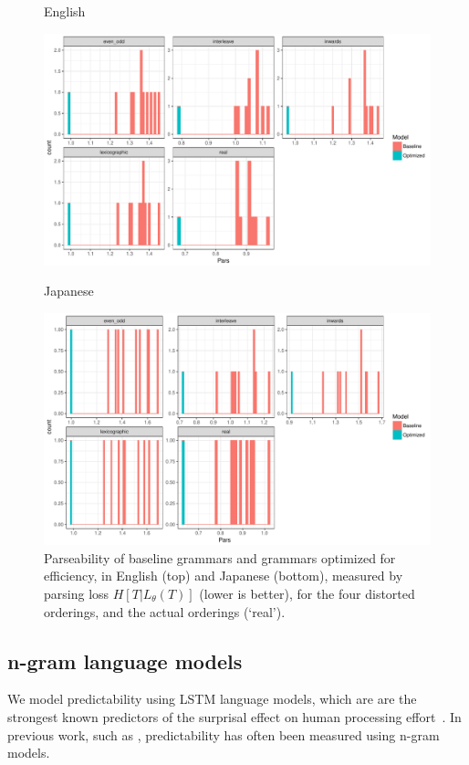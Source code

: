 \documentclass[10pt,twoside,lineno]{article}
\begin{document}
\begin{figure}
    \centering
    English
    
    \includegraphics[scale=.5]{../results/permuted/adversarial-parse-loss-english.pdf}
    
    Japanese
    
    \includegraphics[scale=.5]{../results/permuted/adversarial-parse-loss-japanese.pdf}
	\caption{Parseability of baseline grammars and grammars optimized for efficiency, in English (top) and Japanese (bottom), measured by parsing loss $H[T|L_\theta(T)]$ (lower is better), for the four distorted orderings, and the actual orderings (`real').}
    \label{fig:distorted-parser}
\end{figure}


\subsection{n-gram language models}

We model predictability using LSTM language models, which are are the strongest known predictors of the surprisal effect on human processing effort~\citep{frank2011insensitivity,goodkind2018predictive}.
In previous work, such as \cite{gildea2015human}, predictability has often been measured using n-gram models.
\end{document}
